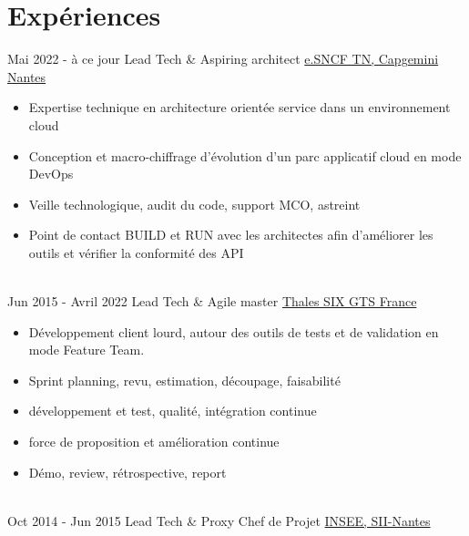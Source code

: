 \documentclass[letterpaper]{twentysecondcv} %
\begin{document}
\makeprofile %


\section{Expériences}

\begin{twenty} %
	\twentyitem
	{Mai 2022 -}
	{à ce jour}
	{Lead Tech \& Aspiring architect}
	{\href{https://www.transilien.com/fr}{e.SNCF TN, Capgemini Nantes}}
	{}
	{\begin{itemize}	
			\item Expertise technique en architecture orientée service dans un environnement cloud
			\item Conception et macro-chiffrage d'évolution d'un parc applicatif cloud en mode DevOps
			\item Veille technologique, audit du code, support MCO, astreint
			\item Point de contact BUILD et RUN avec les architectes afin d'améliorer les outils et vérifier la conformité des API
	\end{itemize}}
	\\
	\twentyitem
    	{Jun 2015 -}
		{Avril 2022}
        {Lead Tech \& Agile master}
        {\href{https://www.thalesgroup.com/fr}{Thales SIX GTS France}}
        {}
        {\begin{itemize} 		
      	\item Développement client lourd, autour des outils de tests et de validation en mode Feature Team.
        \item Sprint planning, revu, estimation, découpage, faisabilité
        \item développement et test, qualité, intégration continue
        \item force de proposition et amélioration continue
        \item Démo, review, rétrospective, report
        \end{itemize}}
        \\
	\twentyitem
    	{Oct 2014 -}
		{Jun 2015}
        {Lead Tech \& Proxy Chef de Projet}
        {\href{https://www.insee.fr/fr/accueil}{INSEE, SII-Nantes}}
        {}
        {
        {\begin{itemize}

\end{itemize}}}
\end{twenty}
\end{document}
